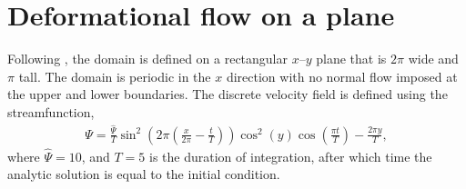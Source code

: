 \section{Deformational flow on a plane}
\label{sec:highOrderFit:deformationPlane}


Following \citet{chen2017}, the domain is defined on a rectangular $x$--$y$ plane that is $2\pi$ wide and $\pi$ tall.  The domain is periodic in the $x$ direction with no normal flow imposed at the upper and lower boundaries.
The discrete velocity field is defined using the streamfunction,
\begin{align}
	\Psi = \frac{\hat{\Psi}}{T} \sin^2 \left( 2 \pi \left( \frac{x}{2\pi} - \frac{t}{T} \right) \right) \cos^2(y) \cos \left( \frac{\pi t}{T} \right) - \frac{2\pi y}{T},
\end{align}
where $\hat{\Psi} = 10$, and $T = 5$ is the duration of integration, after which time the analytic solution is equal to the initial condition.

